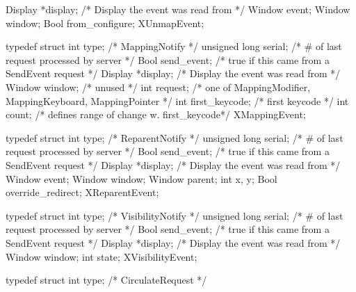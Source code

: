\documentclass{report}
\begin{document}
\begin{itemize}
\begin{cppcode}
{                    Display *display;       /* Display the event was read from */
                    Window event;
                    Window window;
                    Bool from_configure;
                } XUnmapEvent;
            \end{cppcode}
            \begin{cppcode}
                typedef struct {
                    int type;               /* MappingNotify */
                    unsigned long serial;   /* # of last request processed by server */
                    Bool send_event;        /* true if this came from a SendEvent request */
                    Display *display;       /* Display the event was read from */
                    Window window;          /* unused */
                    int request;            /* one of MappingModifier, MappingKeyboard,
                    MappingPointer */
                    int first_keycode;      /* first keycode */
                    int count;              /* defines range of change w. first_keycode*/
                } XMappingEvent;
            \end{cppcode}
            \begin{cppcode}
                typedef struct {
                    int type;               /* ReparentNotify */
                    unsigned long serial;   /* # of last request processed by server */
                    Bool send_event;        /* true if this came from a SendEvent request */
                    Display *display;       /* Display the event was read from */
                    Window event;
                    Window window;
                    Window parent;
                    int x, y;
                    Bool override_redirect;
                } XReparentEvent;
            \end{cppcode}
            \begin{cppcode}
                typedef struct {
                    int type;               /* VisibilityNotify */
                    unsigned long serial;   /* # of last request processed by server */
                    Bool send_event;        /* true if this came from a SendEvent request */
                    Display *display;       /* Display the event was read from */
                    Window window;
                    int state;
                } XVisibilityEvent;
            \end{cppcode}
            \begin{cppcode}
                typedef struct {
                    int type;                   /* CirculateRequest */
}
\end{cppcode}
\end{itemize}
\end{document}
